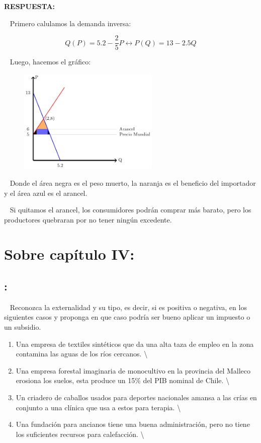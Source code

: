 \documentclass[
  letterpaper,
  DIV=11,
  numbers=noendperiod]{scrreport}
\providecommand{\tightlist}{%
  \setlength{\itemsep}{0pt}\setlength{\parskip}{0pt}}\usepackage{longtable,booktabs,array}
\begin{document}
\textbf{RESPUESTA:}

~ Primero calulamos la demanda inversa:

\[
Q(P)=5.2-\frac{2}{5}P \longleftrightarrow P(Q)=13-2.5Q
\]

~ Luego, hacemos el gráfico:

\begin{figure}

{\centering \includegraphics[width=0.6\textwidth,height=\textheight]{8ej_pauta_files/figure-pdf/unnamed-chunk-14-1.pdf}

}

\end{figure}

~ Donde el área negra es el peso muerto, la naranja es el beneficio del
importador y el área azul es el arancel.

~ Si quitamos el arancel, los consumidores podrán comprar más barato,
pero los productores quebraran por no tener ningún excedente.

\hypertarget{sobre-capuxedtulo-iv-1}{%
\section{Sobre capítulo IV:}\label{sobre-capuxedtulo-iv-1}}

\hypertarget{section-34}{%
\subsection{:}\label{section-34}}

~ Reconozca la externalidad y su tipo, es decir, si es positiva o
negativa, en los siguientes casos y proponga en que caso podría ser
bueno aplicar un impuesto o un subsidio.

\begin{enumerate}
\def\labelenumi{\arabic{enumi})}
\tightlist
\item
  Una empresa de textiles sintéticos que da una alta taza de empleo en
  la zona contamina las aguas de los ríos cercanos. \textbackslash{}
\item
  Una empresa forestal imaginaria de monocultivo en la provincia del
  Malleco erosiona los suelos, esta produce un 15\% del PIB nominal de
  Chile. \textbackslash{}
\item
  Un criadero de caballos usados para deportes nacionales amansa a las
  crías en conjunto a una clínica que usa a estos para terapia.
  \textbackslash{}
\item
  Una fundación para ancianos tiene una buena administración, pero no
  tiene los suficientes recursos para calefacción. \textbackslash{}
\end{enumerate}
\end{document}
